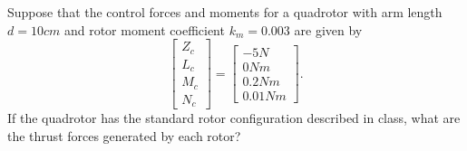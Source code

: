 \begin{question}
    Suppose that the control forces and moments for a quadrotor with arm length $d = 10cm$ and rotor moment coefficient $k_m=0.003$ are given by
\begin{equation*}
    \left[ \begin{array}{c}
        Z_c \\ L_c \\ M_c \\ N_c
    \end{array} \right] = \left[ \begin{array}{c}
        -5 N \\ 0 Nm \\ 0.2 Nm \\ 0.01 Nm
    \end{array} \right] \text{.}
\end{equation*}
    If the quadrotor has the standard rotor configuration described in class, what are the thrust forces generated by each rotor?
\end{question}
